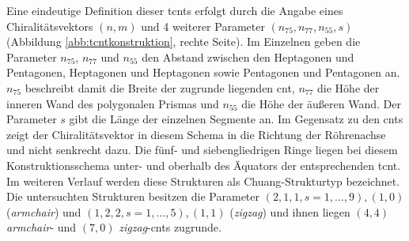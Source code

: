 \FloatBarrier
Eine eindeutige Definition dieser \acp{tcnt} erfolgt durch die Angabe eines Chiralitätsvektors $(n,m)$ und 4 weiterer Parameter $(n_{75},n_{77},n_{55},s)$ (Abbildung \ref{abb:tcntkonstruktion}, rechte Seite). Im Einzelnen geben die Parameter $n_{75}$, $n_{77}$ und $n_{55}$ den Abstand zwischen den Heptagonen und Pentagonen, Heptagonen und Heptagonen sowie Pentagonen und Pentagonen an. $n_{75}$ beschreibt damit die Breite der zugrunde liegenden \ac{cnt}, $n_{77}$ die Höhe der inneren Wand des polygonalen Prismas und $n_{55}$ die Höhe der äußeren Wand. Der Parameter $s$ gibt die Länge der einzelnen Segmente an. Im Gegensatz zu den \acp{cnt} zeigt der Chiralitätsvektor in diesem Schema in die Richtung der Röhrenachse und nicht senkrecht dazu. Die fünf- und siebengliedrigen Ringe liegen bei diesem Konstruktionsschema unter- und oberhalb des Äquators der entsprechenden \ac{tcnt}. Im weiteren Verlauf werden diese Strukturen als \glqq Chuang-Strukturtyp\grqq{} bezeichnet. Die untersuchten Strukturen besitzen die Parameter $(2,1,1,s=1,\dots,9),(1,0)$ (\textit{armchair}) und $(1,2,2,s=1,\dots,5),(1,1)$ (\textit{zigzag}) und ihnen liegen $(4,4)$ \textit{armchair}- und $(7,0)$ \textit{zigzag}-\acp{cnt} zugrunde.\\

